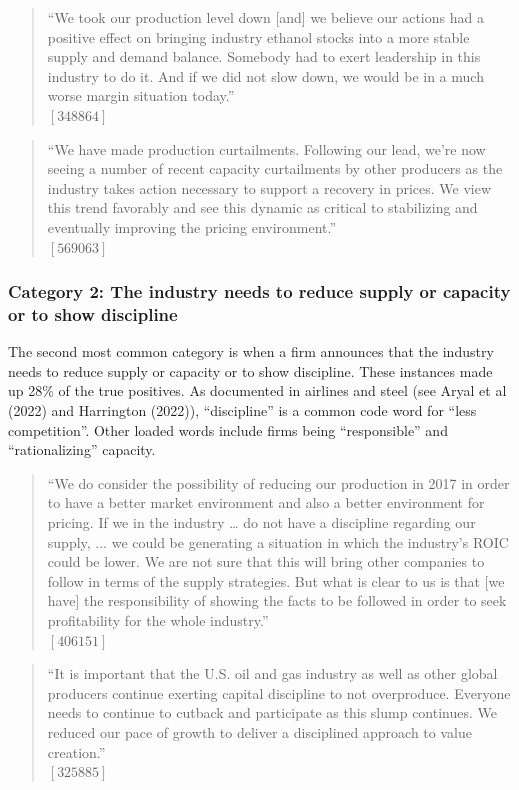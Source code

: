\begin{quote}
``We took our production level down [and] we believe our actions had a positive effect on bringing industry ethanol stocks into a more stable supply and demand balance. Somebody had to exert leadership in this industry to do it. And if we did not slow down, we would be in a much worse margin situation today.'' \\
$[348864]$
\end{quote}

\begin{quote}
``We have made production curtailments. Following our lead, we're now seeing a number of recent capacity curtailments by other producers as the industry takes action necessary to support a recovery in prices. We view this trend favorably and see this dynamic as critical to stabilizing and eventually improving the pricing environment.'' \\
$[569063]$
\end{quote}

\subsubsection{Category 2: The industry needs to reduce supply or capacity or to show discipline}
The second most common category is when a firm announces that the industry needs to reduce supply or capacity or to show discipline. These instances made up 28\% of the true positives. As documented in airlines and steel (see Aryal et al (2022) and Harrington (2022)), ``discipline'' is a common code word for ``less competition''. Other loaded words include firms being ``responsible'' and ``rationalizing'' capacity.

\begin{quote}
``We do consider the possibility of reducing our production in 2017 in order to have a better market environment and also a better environment for pricing. If we in the industry … do not have a discipline regarding our supply, ... we could be generating a situation in which the industry's ROIC could be lower. We are not sure that this will bring other companies to follow in terms of the supply strategies. But what is clear to us is that [we have] the responsibility of showing the facts to be followed in order to seek profitability for the whole industry.'' \\
$[406151]$
\end{quote}

\begin{quote}
``It is important that the U.S. oil and gas industry as well as other global producers continue exerting capital discipline to not overproduce. Everyone needs to continue to cutback and participate as this slump continues. We reduced our pace of growth to deliver a disciplined approach to value creation.'' \\
$[325885]$
\end{quote}

